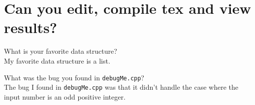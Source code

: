 \documentclass{article}
\begin{document}
    \section{Can you edit, compile tex and view results?}

     What is your favorite data structure?
    \\My favorite data structure is a list.

     What was the bug you found in {\tt debugMe.cpp}?
    \\The bug I found in {\tt debugMe.cpp} was that it didn't handle the case where the input number is an odd positive integer. 
\end{document}
